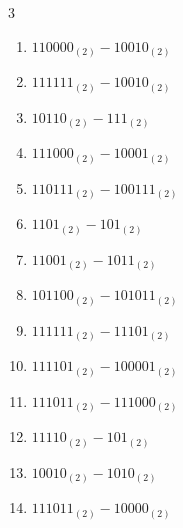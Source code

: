 \begin{multicols}{3}
\begin{enumerate}
  \item $110000_{(2)} - 10010_{(2)}$


  \item $111111_{(2)} - 10010_{(2)}$


  \item $10110_{(2)} - 111_{(2)}$


  \item $111000_{(2)} - 10001_{(2)}$


  \item $110111_{(2)} - 100111_{(2)}$


  \item $1101_{(2)} - 101_{(2)}$


  \item $11001_{(2)} - 1011_{(2)}$


\columnbreak %

\resetques

  \item $101100_{(2)} - 101011_{(2)}$


  \item $111111_{(2)} - 11101_{(2)}$


  \item $111101_{(2)} - 100001_{(2)}$


  \item $111011_{(2)} - 111000_{(2)}$


  \item $11110_{(2)} - 101_{(2)}$


  \item $10010_{(2)} - 1010_{(2)}$


  \item $111011_{(2)} - 10000_{(2)}$


\end{enumerate}
\end{multicols}
